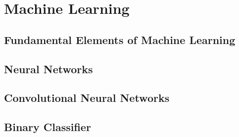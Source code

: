 %
%

\part{Machine Learning}\label{part:machine_learning}

\chapter{Fundamental Elements of Machine Learning}\label{ch:machine_learning:fundamental_elements_of_machine_learning}


\chapter{Neural Networks}\label{ch:machine_learning:neural_networks}


\chapter{Convolutional Neural Networks}\label{ch:machine_learning:convolutional_neural_networks}


\chapter{Binary Classifier}\label{ch:machine_learning:binary_classifier}

